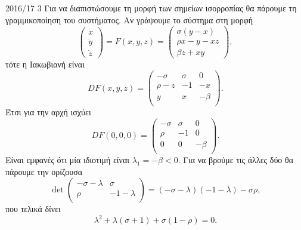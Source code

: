 \begin{solution}{2016/17 3}
    Για να διαπιστώσουμε τη μορφή των σημείων ισορροπίας θα πάρουμε τη
    γραμμικοποίηση του συστήματος. Αν γράψουμε το σύστημα στη μορφή
    \begin{equation*}
        \begin{pmatrix}
            \dot{x} \\
            \dot{y} \\
            \dot{z}
        \end{pmatrix} = F(x, y, z) =
        \begin{pmatrix}
            \sigma(y - x) \\
            \rho x - y - xz \\
            \beta z + xy
        \end{pmatrix},
    \end{equation*}
    τότε η Ιακωβιανή είναι
    \begin{equation*}
        DF(x, y, z) =
        \begin{pmatrix}
            -\sigma & \sigma & 0 \\
            \rho - z & -1 & -x \\
            y & x & -\beta \\
        \end{pmatrix}.
    \end{equation*}
    Έτσι για την αρχή ισχύει
    \begin{equation*}
        DF(0, 0, 0) =
        \begin{pmatrix}
            -\sigma & \sigma & 0 \\
            \rho & -1 & 0 \\
            0 & 0 & -\beta \\
        \end{pmatrix}.
    \end{equation*}
    Είναι εμφανές ότι μία ιδιοτιμή είναι \( \lambda_1 = -\beta < 0\). Για να
    βρούμε τις άλλες δύο θα πάρουμε την ορίζουσα
    \begin{equation*}
        \det
        \begin{pmatrix}
            -\sigma - \lambda & \sigma \\
            \rho & -1 - \lambda \\
        \end{pmatrix}=
        (-\sigma - \lambda)(-1 - \lambda) - \sigma \rho,
    \end{equation*}
    που τελικά δίνει
    \begin{equation*}
        \lambda^2 + \lambda(\sigma + 1) + \sigma(1 - \rho) = 0.

\end{equation*}
\end{solution}
